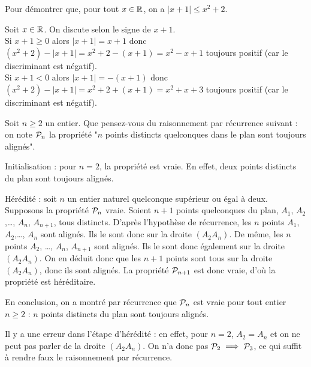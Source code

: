 \begin{question}
Pour démontrer que, pour tout $x\in\mathbb{R}$, on a $|x+1| \le x^2+2$.
\begin{answers} 
\end{answers}
\begin{explanations} 
Soit $x\in\mathbb{R}$. On discute selon le signe de $x+1$.\\
Si $x+1\ge0$ alors $|x+1| = x+1$ donc $(x^2+2) - |x+1| = x^2+2 - (x+1) = x^2-x+1$ toujours positif (car le discriminant est négatif).\\
Si $x+1<0$ alors $|x+1| = -(x+1)$ donc $(x^2+2) - |x+1| = x^2+2 + (x+1) = x^2+x+3$ toujours positif (car le discriminant est négatif).
\end{explanations}
\end{question}


\begin{question}
Soit $n\ge2$ un entier. Que pensez-vous du raisonnement par récurrence suivant : on note ${\cal P}_n$ la propriété "$n$ points distincts quelconques dans le plan sont toujours alignés". 

Initialisation : pour $n=2$, la propriété est vraie. En effet, deux points distincts du plan sont toujours alignés.

Hérédité : soit $n$ un entier naturel quelconque supérieur ou égal à deux. Supposons la propriété ${\cal P}_n$ vraie. Soient $n+1$ points quelconques du plan, $A_1$, $A_2$,\ldots, $A_n$, $A_{n+1}$, tous distincts. D'après l'hypothèse de récurrence, les $n$ points $A_1$, $A_2$,\ldots, $A_n$ sont alignés. Ils le sont donc sur la droite $(A_2A_n)$. 
De même, les $n$ points $A_2$, \ldots, $A_n$, $A_{n+1}$ sont alignés. Ils le sont donc également sur la droite $(A_2A_n)$.
On en déduit donc que les $n+1$ points sont tous sur la droite $(A_2A_n)$, donc ils sont alignés. La propriété ${\cal P}_{n+1}$ est donc vraie, d'où la propriété est héréditaire.

En conclusion, on a montré par récurrence que ${\cal P}_n$ est vraie pour tout entier $n\ge 2$ : $n$ points distincts du plan sont toujours alignés.
\begin{answers} 
\end{answers}
\begin{explanations} 
Il y a une erreur dans l'étape d'hérédité : en effet, pour $n=2$, $A_2=A_n$ et on ne peut pas parler de la droite $(A_2A_n)$. On n'a donc pas ${\cal P}_2\implies {\cal P}_3$, ce qui suffit à rendre faux le raisonnement par récurrence.
\end{explanations}
\end{question}

